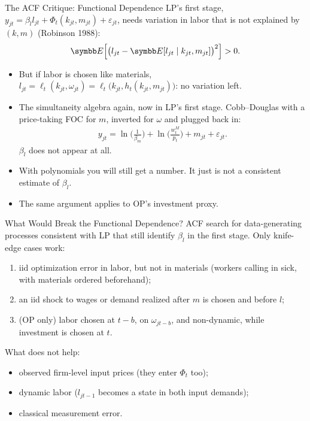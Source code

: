 \documentclass[aspectratio=169,10pt]{beamer}
\begin{document}
\begin{frame}{The ACF Critique: Functional Dependence}
LP's first stage, $y_{jt} = \beta_l l_{jt} + \Phi_t(k_{jt}, m_{jt}) + \varepsilon_{jt}$, needs variation in labor that is not explained by $(k, m)$ (Robinson 1988):
\begin{align*}
\E\Big[\big(l_{jt} - \E[l_{jt} \mid k_{jt}, m_{jt}]\big)^2\Big] > 0.
\end{align*}
\begin{itemize}
\item But if labor is chosen like materials, $l_{jt} = \ell_t(k_{jt}, \omega_{jt}) = \ell_t\big(k_{jt}, h_t(k_{jt}, m_{jt})\big)$: \alert{no variation left}.
\item The simultaneity algebra again, now in LP's first stage. Cobb--Douglas with a price-taking FOC for $m$, inverted for $\omega$ and plugged back in:
\begin{align*}
y_{jt} = \ln\Big(\frac{1}{\beta_m}\Big) + \ln\Big(\frac{w^M_t}{p_t}\Big) + m_{jt} + \varepsilon_{jt}.
\end{align*}
$\beta_l$ does not appear at all.
\item With polynomials you will still get a number. It just is not a consistent estimate of $\beta_l$.
\item The same argument applies to OP's investment proxy.
\end{itemize}
\end{frame}


\begin{frame}{What Would Break the Functional Dependence?}
ACF search for data-generating processes consistent with LP that still identify $\beta_l$ in the first stage. Only knife-edge cases work:
\begin{enumerate}
\item iid \alert{optimization error} in labor, but not in materials (workers calling in sick, with materials ordered beforehand);
\item an iid shock to wages or demand realized \alert{after} $m$ is chosen and \alert{before} $l$;
\item (OP only) labor chosen at $t-b$, on $\omega_{jt-b}$, and non-dynamic, while investment is chosen at $t$.
\end{enumerate}
What does \alert{not} help:
\begin{itemize}
\item observed firm-level input prices (they enter $\Phi_t$ too);
\item dynamic labor ($l_{jt-1}$ becomes a state in both input demands);
\item classical measurement error.
\end{itemize}
\end{frame}
\end{document}

